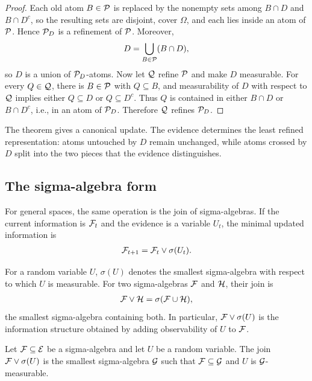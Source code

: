 \begin{proof}
Each old atom $B\in\mathcal{P}$ is replaced by the nonempty sets among $B\cap D$ and $B\cap D^c$, so the resulting sets are disjoint, cover $\Omega$, and each lies inside an atom of $\mathcal{P}$. Hence $\mathcal{P}_D$ is a refinement of $\mathcal{P}$. Moreover,
\begin{align*}
D=\bigcup_{B\in\mathcal{P}}(B\cap D),
\end{align*}
so $D$ is a union of $\mathcal{P}_D$-atoms. Now let $\mathcal{Q}$ refine $\mathcal{P}$ and make $D$ measurable. For every $Q\in\mathcal{Q}$, there is $B\in\mathcal{P}$ with $Q\subseteq B$, and measurability of $D$ with respect to $\mathcal{Q}$ implies either $Q\subseteq D$ or $Q\subseteq D^c$. Thus $Q$ is contained in either $B\cap D$ or $B\cap D^c$, i.e., in an atom of $\mathcal{P}_D$. Therefore $\mathcal{Q}$ refines $\mathcal{P}_D$.
\end{proof}

The theorem gives a canonical update. The evidence determines the least refined representation: atoms untouched by $D$ remain unchanged, while atoms crossed by $D$ split into the two pieces that the evidence distinguishes.

\subsection{The sigma-algebra form}

For general spaces, the same operation is the join of sigma-algebras. If the current information is $\mathcal{F}_t$ and the evidence is a variable $U_t$, the minimal updated information is
\begin{align*}
\mathcal{F}_{t+1}=\mathcal{F}_t\vee\sigma(U_t).
\end{align*}

\begin{definition}
\label{def:sigma-join}
For a random variable $U$, $\sigma(U)$ denotes the smallest sigma-algebra with respect to which $U$ is measurable. For two sigma-algebras $\mathcal{F}$ and $\mathcal{H}$, their join is
\begin{align*}
\mathcal{F}\vee\mathcal{H}=\sigma(\mathcal{F}\cup\mathcal{H}),
\end{align*}
the smallest sigma-algebra containing both. In particular, $\mathcal{F}\vee\sigma(U)$ is the information structure obtained by adding observability of $U$ to $\mathcal{F}$.
\end{definition}

\begin{theorem}
\label{thm:sigma-refinement:informal}
Let $\mathcal{F}\subseteq\mathcal{E}$ be a sigma-algebra and let $U$ be a random variable. The join $\mathcal{F}\vee\sigma(U)$ is the smallest sigma-algebra $\mathcal{G}$ such that $\mathcal{F}\subseteq\mathcal{G}$ and $U$ is $\mathcal{G}$-measurable.
\end{theorem}

